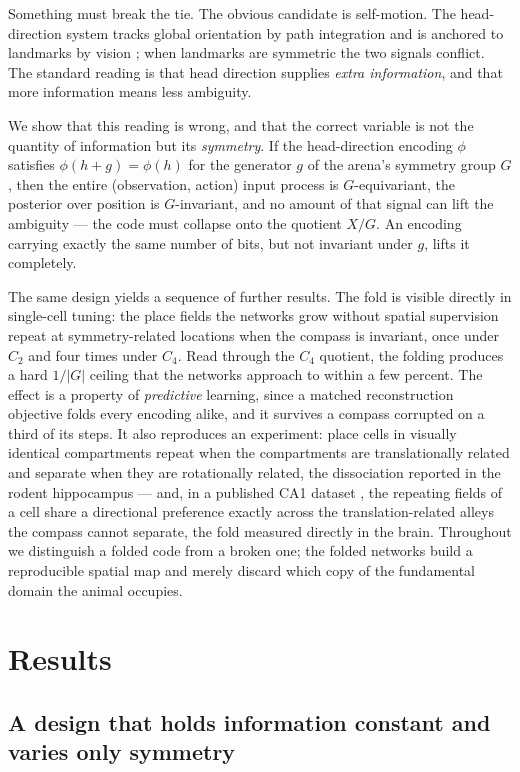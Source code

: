 \documentclass[9pt,lineno]{elife}
\begin{document}
Something must break the tie. The obvious candidate is self-motion. The head-direction system
tracks global orientation by path integration and is anchored to landmarks by vision
\citep{taube1990, knierim1995}; when landmarks are symmetric the two signals conflict. The
standard reading is that head direction supplies \emph{extra information}, and that more
information means less ambiguity.

We show that this reading is wrong, and that the correct variable is not the quantity of
information but its \emph{symmetry}. If the head-direction encoding $\phi$ satisfies
$\phi(h + g) = \phi(h)$ for the generator $g$ of the arena's symmetry group $G$, then the
entire (observation, action) input process is $G$-equivariant, the posterior over position is
$G$-invariant, and no amount of that signal can lift the ambiguity --- the code must collapse
onto the quotient $X/G$. An encoding carrying exactly the same number of bits, but not
invariant under $g$, lifts it completely.

The same design yields a sequence of further results. The fold is visible directly in
single-cell tuning: the place fields the networks grow without spatial supervision repeat at
symmetry-related locations when the compass is invariant, once under $C_2$ and four times under
$C_4$. Read through the $C_4$ quotient, the folding produces a hard $1/|G|$ ceiling that the
networks approach to within a few percent. The effect is a property of \emph{predictive} learning, since a matched
reconstruction objective folds every encoding alike, and it survives a compass corrupted on a
third of its steps. It also reproduces an experiment: place cells in visually identical
compartments repeat when the compartments are translationally related and separate when they
are rotationally related, the dissociation \citet{grieves2016} reported in the rodent
hippocampus --- and, in a published CA1 dataset \citep{hockeimer2023}, the repeating fields of a
cell share a directional preference exactly across the translation-related alleys the compass
cannot separate, the fold measured directly in the brain. Throughout we distinguish a folded code
from a broken one; the folded networks build a reproducible spatial map and merely discard which
copy of the fundamental domain the animal occupies.

\section{Results}

\subsection{A design that holds information constant and varies only symmetry}
\end{document}
